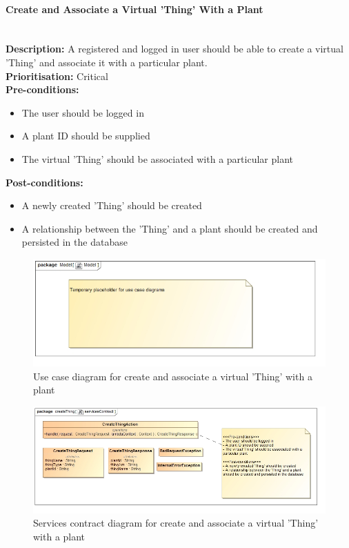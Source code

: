 \documentclass{article}
\begin{document}
	\paragraph{Create and Associate a Virtual 'Thing' With a Plant}\mbox{}\\
		\textbf{Description:} A registered and logged in user should be able to create a virtual 'Thing' and associate it with a particular plant.\\
		\textbf{Prioritisation:} Critical\\		
		\textbf{Pre-conditions:}
			\begin{itemize}
				\item The user should be logged in
				\item A plant ID should be supplied
				\item The virtual 'Thing' should be associated with a particular plant
			\end{itemize}
		\textbf{Post-conditions:}
			\begin{itemize}
				\item A newly created 'Thing' should be created
				\item A relationship between the 'Thing' and a plant should be created and persisted in the database
			\end{itemize}

		\begin{figure}[H]
			\includegraphics[width=\linewidth]{images/tempUseCase.jpg}
			\caption{Use case diagram for create and associate a virtual 'Thing' with a plant}
		\end{figure}
		
		\begin{figure}[H]
			\includegraphics[width=\linewidth]{images/ServicesContracts/createThing.jpg}
			\caption{Services contract diagram for create and associate a virtual 'Thing' with a plant}
		\end{figure}
		
\end{document}
